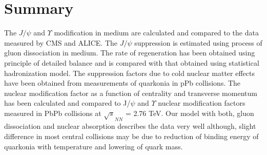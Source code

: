 \documentclass[aps,prc,preprint,superscriptaddress,showpacs,showkeys]{revtex4-1}
\begin{document}




\section{Summary}

 The $J/\psi$ and $\Upsilon$ modification in medium are calculated and compared to the data
measured by CMS and ALICE.
  The $J/\psi$ suppression is estimated using process of gluon dissociation in medium. The rate of regeneration 
has been obtained using principle of detailed balance and is compared with that obtained using statistical 
hadronization model. 
 The suppression factors due to cold nuclear matter effects 
have been obtained from measurements of quarkonia in pPb collisions.
 The nuclear modification factor as a function of centrality and transverse momentum has been calculated  
and compared to J/$\psi$ and $\Upsilon$ nuclear modification factors measured in PbPb collisions 
at $\sqrt s_{NN}$ =  2.76 TeV.
  Our model with both, gluon dissociation and nuclear absorption describes the data very well although, 
slight difference in most central collisions may be due to reduction of binding energy of quarkonia with temperature 
and lowering of quark mass.
\end{document}

